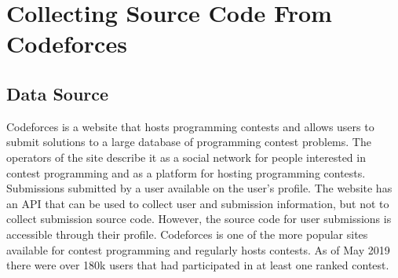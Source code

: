 \documentclass[12pt]{article}
\begin{document}
\section{Collecting Source Code From Codeforces}

\subsection{Data Source}
Codeforces is a website that hosts programming contests and allows users to submit solutions to a large database of programming contest problems. The operators of the site describe it as a social network for people interested in contest programming and as a platform for hosting programming contests\cite{WEBSITE:CF1}. Submissions submitted by a user available on the user's profile. The website has an API that can be used to collect user and submission information, but not to collect submission source code. However, the source code for user submissions is accessible through their profile. Codeforces is one of the more popular sites available for contest programming and regularly hosts contests. As of May 2019 there were over 180k users that had participated in at least one ranked contest.

\end{document}
